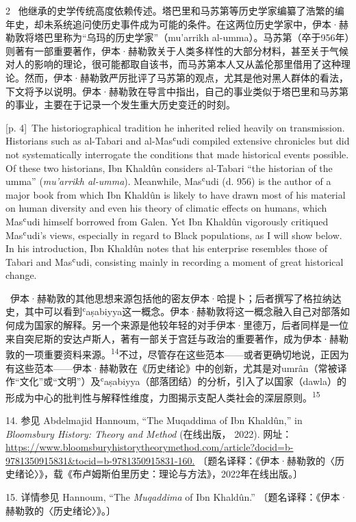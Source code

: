 \documentclass[10pt,a4paper]{article}
\begin{document}
\begin{paracol}{2}
\switchcolumn*
{\scriptsize\color{gray} [p. 4]}\ 他继承的史学传统高度依赖传述。塔巴里和马苏第等历史学家编纂了浩繁的编年史，却未系统追问使历史事件成为可能的条件。在这两位历史学家中，伊本·赫勒敦将塔巴里称为“乌玛的历史学家”（mu’arrikh al-umma）。马苏第（卒于956年）则著有一部重要著作，伊本·赫勒敦关于人类多样性的大部分材料，甚至关于气候对人的影响的理论，很可能都取自该书，而马苏第本人又从盖伦那里借用了这种理论。然而，伊本·赫勒敦严厉批评了马苏第的观点，尤其是他对黑人群体的看法，下文将予以说明。伊本·赫勒敦在导言中指出，自己的事业类似于塔巴里和马苏第的事业，主要在于记录一个发生重大历史变迁的时刻。\par
\switchcolumn
{\scriptsize\color{gray} [p. 4]}\ The historiographical tradition he inherited relied heavily on transmission. Historians such as al-Tabari and al-Masʿudi compiled extensive chronicles but did not systematically interrogate the conditions that made historical events possible. Of these two historians, Ibn Khaldûn considers al-Tabari “the historian of the umma” (\textit{mu’arrikh al-umma}). Meanwhile, Masʿudi (d. 956) is the author of a major book from which Ibn Khaldûn is likely to have drawn most of his material on human diversity and even his theory of climatic effects on humans, which Masʿudi himself borrowed from Galen. Yet Ibn Khaldûn vigorously critiqued Masʿudi’s views, especially in regard to Black populations, as I will show below. In his introduction, Ibn Khaldûn notes that his enterprise resembles those of Tabari and Masʿudi, consisting mainly in recording a moment of great historical change.\par
\switchcolumn*
{\scriptsize\color{gray} [p. 4]}\ 伊本·赫勒敦的其他思想来源包括他的密友伊本·哈提卜；后者撰写了格拉纳达史，其中可以看到ʿaṣabiyya这一概念。伊本·赫勒敦将这一概念融入自己对部落如何成为国家的解释。另一个来源是他较年轻的对手伊本·里德万，后者同样是一位来自突尼斯的安达卢斯人，著有一部关于宫廷与政治的重要著作，成为伊本·赫勒敦的一项重要资料来\mbox{源。\textsuperscript{14}}不过，尽管存在这些范本——或者更确切地说，正因为有这些范本——伊本·赫勒敦在《历史绪论》中的创新，尤其是对umrân（常被译作“文化”或“文明”）及ʿaṣabiyya（部落团结）的分析，引入了以国家（dawla）的形成为中心的批判性与解释性维度，力图揭示支配人类社会的深层原\mbox{则。\textsuperscript{15}}\par{\small 14. 参见 Abdelmajid Hannoum, “The Muqaddima of Ibn Khaldûn,” in \textit{Bloomsbury History: Theory and Method} (在线出版， 2022). 网址： \url{https://www.bloomsburyhistorytheorymethod.com/article?docid=b-9781350915831&tocid=b-9781350915831-160.} 〔题名译释：《伊本·赫勒敦的〈历史绪论〉》，载《布卢姆斯伯里历史：理论与方法》，2022年在线出版。〕\par}{\small 15. 详情参见 Hannoum, “The \textit{Muqaddima} of Ibn Khaldûn.” 〔题名译释：《伊本·赫勒敦的〈历史绪论〉》。〕\par}

\end{paracol}
\end{document}
